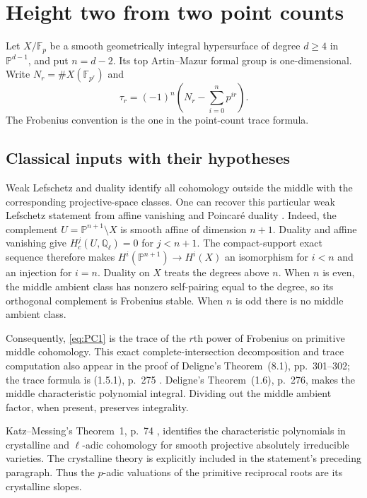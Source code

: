 \section{Height two from two point counts}
\label{sec:point-count-height-two}
Let $X/\mathbb F_p$ be a smooth geometrically integral hypersurface
of degree $d\ge4$ in $\mathbb P^{d-1}$, and put $n=d-2$.
Its top Artin--Mazur formal group is one-dimensional.
Write $N_r=\#X(\mathbb F_{p^r})$ and
\begin{equation}
 \tau_r=(-1)^n\left(N_r-\sum_{i=0}^{n}p^{ir}\right).
                                                               \label{eq:PC1}
\end{equation}
The Frobenius convention is the one in the point-count trace formula.

\subsection{Classical inputs with their hypotheses}
Weak Lefschetz and duality identify all cohomology outside the middle
with the corresponding projective-space classes. One can recover this
particular weak Lefschetz statement from affine vanishing
\citep[Theorem~15.1, p.~105]{MilneLEC2013} and Poincar\'e duality
\citep[Theorem~24.1, p.~144]{MilneLEC2013}.
Indeed, the complement $U=\mathbb P^{n+1}\setminus X$ is smooth affine
of dimension $n+1$. Duality and affine vanishing give
$H_c^j(U,\mathbb Q_\ell)=0$ for $j<n+1$.
The compact-support exact sequence therefore makes
$H^i(\mathbb P^{n+1})\to H^i(X)$ an isomorphism for $i<n$ and
an injection for $i=n$. Duality on $X$ treats the degrees above $n$.
When $n$ is even, the middle ambient class has nonzero self-pairing
equal to the degree, so its orthogonal complement is Frobenius stable.
When $n$ is odd there is no middle ambient class.

Consequently, \eqref{eq:PC1} is the trace of the $r$th power of Frobenius on
primitive middle cohomology. This exact complete-intersection
decomposition and trace computation also appear in the proof of
Deligne's Theorem~(8.1), pp.~301--302; the trace formula is
(1.5.1), p.~275 \citep{Deligne1974}.
Deligne's Theorem~(1.6), p.~276, makes the middle characteristic
polynomial integral. Dividing out the middle ambient factor, when
present, preserves integrality.

Katz--Messing's Theorem~1, p.~74 \citep{KatzMessing1974}, identifies
the characteristic polynomials in crystalline and $\ell$-adic
cohomology for smooth projective absolutely irreducible varieties.
The crystalline theory is explicitly included in the statement's
preceding paragraph. Thus the $p$-adic valuations of the primitive
reciprocal roots are its crystalline slopes.

